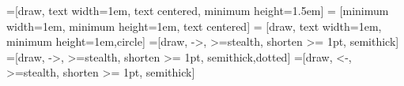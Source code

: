 \documentclass{article}
\begin{document}
    
    
    =[draw, text width=1em, text centered, minimum height=1.5em]
     = [minimum width=1em, minimum height=1em, text centered]
     = [draw, text width=1em, minimum height=1em,circle]
     =[draw, ->, >=stealth, shorten >= 1pt, semithick]
     =[draw, ->, >=stealth, shorten >= 1pt, semithick,dotted]
     =[draw, <-, >=stealth, shorten >= 1pt, semithick]
    
    \def\blockdist{1.25}
    \def\edgedist{1.5}
    \def\encodedist{(-1.5,0)}
    \def\putdist{(0,-1.5)}
    \def\decodedist{(1.5,0)}
    
\end{document}
